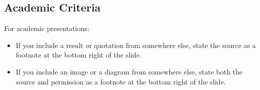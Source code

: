 \subsection{Academic Criteria}

For academic presentations:
\begin{itemize}
\item If you include a result or quotation from somewhere else, state
  the source as a footnote at the bottom right of the slide.

\item If you include an image or a diagram from somewhere else, state
  both the source and permission as a footnote at the bottom right of
  the slide.

\end{itemize}


